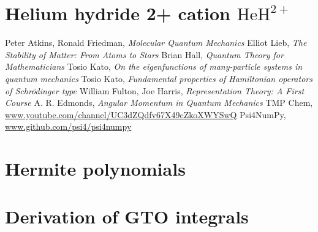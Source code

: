 \documentclass{article}
\newcommand{\molecule}[1]{\textrm{#1}}
\begin{document}
\section{Helium hydride 2+ cation \(\molecule{HeH}^{2+}\)}

\begin{thebibliography}{9}
	Peter Atkins, Ronald Friedman,
	\textit{Molecular Quantum Mechanics}
	Elliot Lieb,
	\textit{The Stability of Matter: From Atoms to Stars}
	Brian Hall,
	\textit{Quantum Theory for Mathematicians}
	Tosio Kato,
	\textit{On the eigenfunctions of many-particle systems in quantum mechanics}
	Tosio Kato,
	\textit{Fundamental properties of Hamiltonian operators of Schrödinger type}
	William Fulton, Joe Harris,
	\textit{Representation Theory: A First Course}
	A. R. Edmonds,
	\textit{Angular Momentum in Quantum Mechanics}
	TMP Chem,
	\url{www.youtube.com/channel/UC3dZQdfv67X49cZkoXWYSwQ}
	Psi4NumPy,
	\url{www.github.com/psi4/psi4numpy}
\end{thebibliography}

\begin{appendices}
\section{Hermite polynomials} \label{apx:hermite}
\section{Derivation of GTO integrals} \label{apx:integrals}
\end{appendices}
\end{document}
